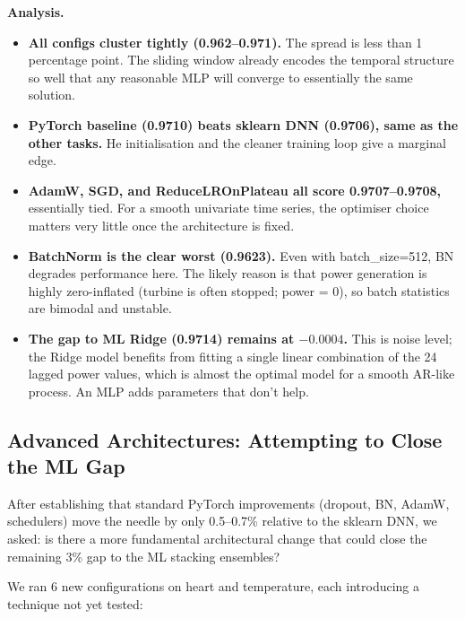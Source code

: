 \documentclass[11pt,a4paper]{article}
\begin{document}
\textbf{Analysis.}

\begin{itemize}[leftmargin=1.2em,itemsep=0.15em]
    \item \textbf{All configs cluster tightly (0.962--0.971).} The spread is less than 1 percentage point. The sliding window already encodes the temporal structure so well that any reasonable MLP will converge to essentially the same solution.
    \item \textbf{PyTorch baseline (0.9710) beats sklearn DNN (0.9706), same as the other tasks.} He initialisation and the cleaner training loop give a marginal edge.
    \item \textbf{AdamW, SGD, and ReduceLROnPlateau all score 0.9707--0.9708,} essentially tied. For a smooth univariate time series, the optimiser choice matters very little once the architecture is fixed.
    \item \textbf{BatchNorm is the clear worst (0.9623).} Even with batch\_size=512, BN degrades performance here. The likely reason is that power generation is highly zero-inflated (turbine is often stopped; power = 0), so batch statistics are bimodal and unstable.
    \item \textbf{The gap to ML Ridge (0.9714) remains at $-0.0004$.} This is noise level; the Ridge model benefits from fitting a single linear combination of the 24 lagged power values, which is almost the optimal model for a smooth AR-like process. An MLP adds parameters that don't help.
\end{itemize}

\subsection{Advanced Architectures: Attempting to Close the ML Gap}

After establishing that standard PyTorch improvements (dropout, BN, AdamW, schedulers) move the needle by only 0.5--0.7\% relative to the sklearn DNN, we asked: is there a more fundamental architectural change that could close the remaining 3\% gap to the ML stacking ensembles?

We ran 6 new configurations on heart and temperature, each introducing a technique not yet tested:
\end{document}
